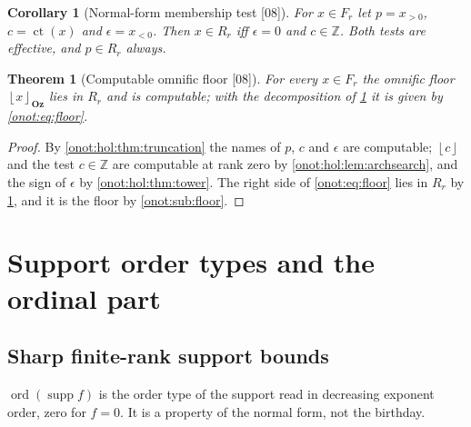 \documentclass[11pt,oneside]{article}
\numberwithin{equation}{section}
\newtheorem{theorem}{Theorem}[section]
\newtheorem{corollary}[corollary]{Corollary}
\theoremstyle{definition}
\theoremstyle{remark}
\newcommand{\Oz}{\mathbf{Oz}}
\newcommand{\Z}{\mathbb Z}
\newcommand{\supp}{\operatorname{supp}}
\newcommand{\ct}{\operatorname{ct}}
\newcommand{\ord}{\operatorname{ord}}
\newcommand{\fl}[1]{\left\lfloor #1\right\rfloor_{\Oz}}
\newcommand{\floor}[1]{\left\lfloor #1\right\rfloor}
\newcommand{\src}[1]{\textup{\textsf{\small[#1]}}}
\begin{document}
\begin{corollary}[Normal-form membership test \src{08}]\label{onot:hol:cor:oztest}
For $x\in F_r$ let $p=x_{>0}$, $c=\ct(x)$ and $\epsilon=x_{<0}$. Then
$x\in R_r$ iff $\epsilon=0$ and $c\in\Z$. Both tests are effective, and
$p\in R_r$ always.
\end{corollary}

\begin{theorem}[Computable omnific floor \src{08}]\label{onot:hol:thm:floor}
For every $x\in F_r$ the omnific floor $\fl x$ lies in $R_r$ and is computable;
with the decomposition of \cref{onot:hol:cor:oztest} it is given by
\eqref{onot:eq:floor}.
\end{theorem}
\begin{proof}
By \cref{onot:hol:thm:truncation} the names of $p$, $c$ and $\epsilon$ are
computable; $\floor c$ and the test $c\in\Z$ are computable at rank zero by
\cref{onot:hol:lem:archsearch}, and the sign of $\epsilon$ by
\cref{onot:hol:thm:tower}. The right side of \eqref{onot:eq:floor} lies in $R_r$
by \cref{onot:hol:cor:oztest}, and it is the floor by \cref{onot:sub:floor}.
\end{proof}

\section{Support order types and the ordinal part}\label{onot:hol:sec:ordinals}

\subsection{Sharp finite-rank support bounds}

$\ord(\supp f)$ is the order type of the support read in decreasing exponent
order, zero for $f=0$. It is a property of the normal form, not the birthday.
\end{document}
